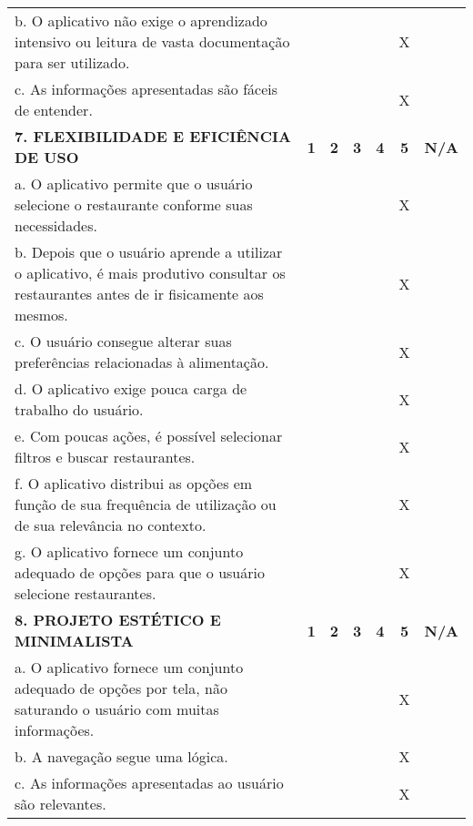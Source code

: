 \documentclass[portuguese,oneside]{tcc}
\begin{document}
\begin{center}
\begin{longtabu}{|L{25em}|c|c|c|c|c|c|}
																																	b. O aplicativo não exige o aprendizado intensivo ou leitura de vasta documentação para ser utilizado. & & & & & X & \\ 
																																	c. As informações apresentadas são fáceis de entender. & & & & & X & \\ 
																																	\textbf{7. FLEXIBILIDADE E EFICIÊNCIA DE USO} & \textbf{1} & \textbf{2} & \textbf{3} & \textbf{4} & \textbf{5} & \textbf{N/A} \\ 
																																	a. O aplicativo permite que o usuário selecione o restaurante conforme suas necessidades. & & & & & X & \\ 
																																	b. Depois que o usuário aprende a utilizar o aplicativo, é mais produtivo consultar os restaurantes antes de ir fisicamente aos mesmos. & & & & & X & \\ 
																																	c. O usuário consegue alterar suas preferências relacionadas à alimentação. & & & & & X & \\ 
																																	d. O aplicativo exige pouca carga de trabalho do usuário. & & & & & X & \\ 
																																	e. Com poucas ações, é possível selecionar filtros e buscar restaurantes. & & & & & X & \\ 
																																	f. O aplicativo distribui as opções em função de sua frequência de utilização ou de sua relevância no contexto.	& & & & & X & \\ 
																																	g. O aplicativo fornece um conjunto adequado de opções para que o usuário selecione restaurantes. & & & & & X & \\ 
																																	\textbf{8. PROJETO ESTÉTICO E MINIMALISTA} & \textbf{1} & \textbf{2} & \textbf{3} & \textbf{4} & \textbf{5} & \textbf{N/A} \\ 
																																	a. O aplicativo fornece um conjunto adequado de opções por tela, não saturando o usuário com muitas informações. & & & & & X & \\ 
																																	b. A navegação segue uma lógica. & & & & & X & \\ 
																																	c. As informações apresentadas ao usuário são relevantes. & & & & & X & \\ 

\end{longtabu}
\end{center}
\end{document}
